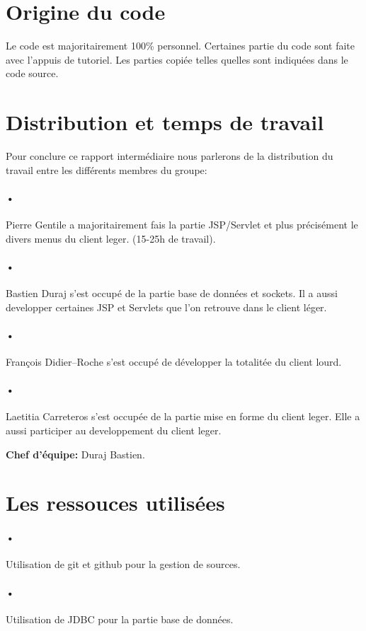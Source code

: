 \documentclass[11pt,a4paper]{article}
\begin{document}
\section{Origine du code}
Le code est majoritairement 100\% personnel. Certaines partie du code
sont faite avec l'appuis de tutoriel. Les parties copiée telles quelles
sont indiquées dans le code source.

\section{Distribution et temps de travail}
Pour conclure ce rapport intermédiaire nous parlerons de la distribution du travail entre les différents membres du groupe:\\
\paragraph{•} Pierre Gentile a majoritairement fais la partie
JSP/Servlet et plus précisément le divers menus du client
leger. (15-25h de travail).
\paragraph{•} Bastien Duraj s'est occupé de la partie base de données
et sockets. Il a aussi developper certaines JSP et Servlets que l'on
retrouve dans le client léger.
\paragraph{•} François Didier--Roche s'est occupé de développer la
totalitée du client lourd.
\paragraph{•} Laetitia Carreteros s'est occupée de la partie mise en
forme du client leger. Elle a aussi participer au developpement du
client leger.


\textbf{Chef d'équipe:} Duraj Bastien.

\newpage

\section{Les ressouces utilisées}
\paragraph{•} Utilisation de git et github pour la gestion de sources.
\paragraph{•} Utilisation de JDBC pour la partie base de données.
\end{document}
